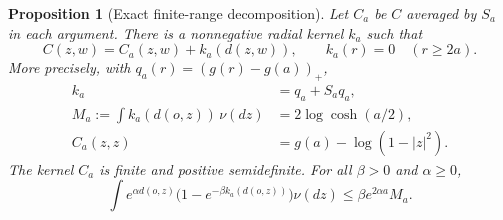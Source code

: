 \documentclass[11pt]{article}
\newtheorem{proposition}[theorem]{Proposition}
\theoremstyle{remark}\newtheorem{remark}[theorem]{Remark}
\begin{document}
\begin{proposition}[Exact finite-range decomposition]
\label{prop:smearing-exact}
Let $C_a$ be $C$ averaged by $S_a$ in each argument.  There is a nonnegative
radial kernel $k_a$ such that
\[
 C(z,w)=C_a(z,w)+k_a(d(z,w)),\qquad
 k_a(r)=0\quad(r\ge2a).
\]
More precisely, with $q_a(r)=(g(r)-g(a))_+$,
\begin{align}
 k_a&=q_a+S_aq_a,\\
 M_a:=\int k_a(d(o,z))\,\nu(dz)&=2\log\cosh(a/2),\\
 C_a(z,z)&=g(a)-\log(1-|z|^2).
\end{align}
The kernel $C_a$ is finite and positive semidefinite.  For all
$\beta>0$ and $\alpha\ge0$,
\begin{equation}\label{eq:short-bond-norm}
 \int e^{\alpha d(o,z)}\bigl(1-e^{-\beta k_a(d(o,z))}\bigr)\nu(dz)
 \le \beta e^{2\alpha a}M_a.
\end{equation}
\end{proposition}
\end{document}
